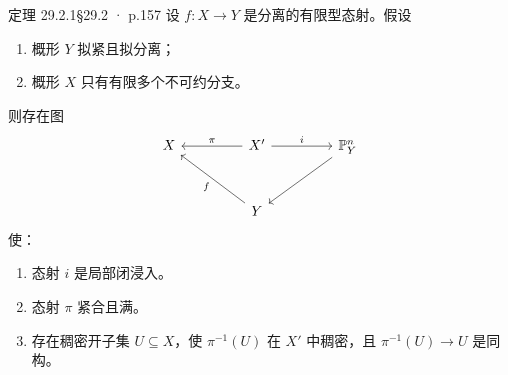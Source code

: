 \documentclass[UTF8,10pt,fontset=windows]{ctexart}
\begin{document}
\begin{card}{定理 29.2.1}{§29.2 · p.157}
设 $f\colon X\to Y$ 是分离的有限型态射。假设
\begin{enumerate}[label=(\alph*),leftmargin=2.6em,itemsep=0.25ex]
  \item 概形 $Y$ 拟紧且拟分离；
  \item 概形 $X$ 只有有限多个不可约分支。
\end{enumerate}
则存在图
\begin{equation}
\begin{tikzcd}[column sep=4.4em, row sep=3em]
X & X' \arrow[l, "\pi"'] \arrow[r, "i"] & \PP^n_Y \arrow[dl] \\
& Y \arrow[ul, "f"] &
\end{tikzcd}
\end{equation}
使：
\begin{enumerate}[label=(\roman*),leftmargin=2.6em,itemsep=0.25ex]
  \item 态射 $i$ 是局部闭浸入。
  \item 态射 $\pi$ 紧合且满。
  \item 存在稠密开子集 $U\subseteq X$，使 $\pi^{-1}(U)$ 在 $X'$ 中稠密，且 $\pi^{-1}(U)\to U$ 是同构。
\end{enumerate}
\end{card}
\end{document}
